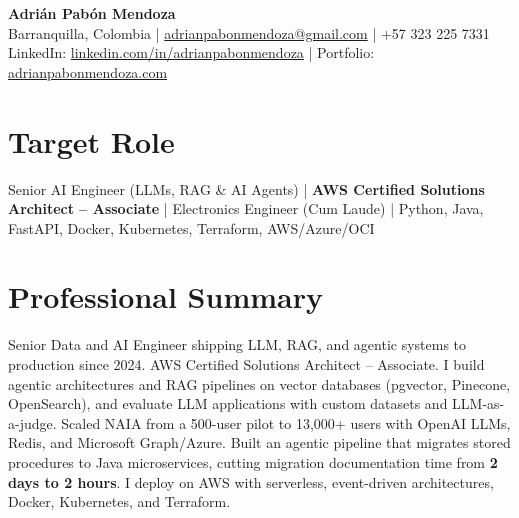 \documentclass[letterpaper,10pt]{article}
\begin{document}
\begin{center}
  {\LARGE \textbf{Adrián Pabón Mendoza}} \\[4pt]
  Barranquilla, Colombia \;|\;
  \href{mailto:adrianpabonmendoza@gmail.com}{adrianpabonmendoza@gmail.com} \;|\;
  +57 323 225 7331 \\[2pt]
  LinkedIn: \href{https://www.linkedin.com/in/adrianpabonmendoza/}{linkedin.com/in/adrianpabonmendoza} \;|\;
  Portfolio: \href{https://www.adrianpabonmendoza.com/}{adrianpabonmendoza.com}
\end{center}

\section{Target Role}
\small
Senior AI Engineer (LLMs, RAG \& AI Agents) \;|\; \textbf{AWS Certified Solutions Architect -- Associate} \;|\; Electronics Engineer (Cum Laude) \;|\; Python, Java, FastAPI, Docker, Kubernetes, Terraform, AWS/Azure/OCI

\section{Professional Summary}
\small
Senior Data and AI Engineer shipping LLM, RAG, and agentic systems to production since 2024. AWS Certified Solutions Architect -- Associate. I build agentic architectures and RAG pipelines on vector databases (pgvector, Pinecone, OpenSearch), and evaluate LLM applications with custom datasets and LLM-as-a-judge. Scaled NAIA from a 500-user pilot to 13{,}000+ users with OpenAI LLMs, Redis, and Microsoft Graph/Azure. Built an agentic pipeline that migrates stored procedures to Java microservices, cutting migration documentation time from \textbf{2 days to 2 hours}. I deploy on AWS with serverless, event-driven architectures, Docker, Kubernetes, and Terraform.

\end{document}
